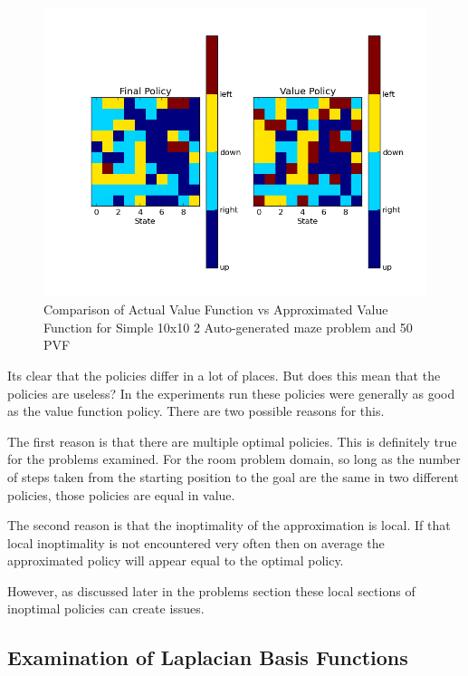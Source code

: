 \documentclass[12pt, letterpaper, final]{report}
\begin{document}
\FloatBarrier
\begin{figure}[h!]
\centering
\includegraphics[scale=.5]{images/maze01_policy_comparison_k50_s5000.png}
\caption{Comparison of Actual Value Function vs Approximated Value
  Function for Simple 10x10 2 Auto-generated maze problem and 50 PVF}
\label{valueVsQ3}
\end{figure}
\FloatBarrier

Its clear that the policies differ in a lot of places. But does this
mean that the policies are useless? In the experiments run these
policies were generally as good as the value function policy. There
are two possible reasons for this.

The first reason is that there are multiple optimal policies. This
is definitely true for the problems examined. For the room problem
domain, so long as the number of
steps taken from the starting position to the goal are the same in two
different policies, those policies are equal in value.

The second reason is that the inoptimality of the approximation is
local. If that local inoptimality is not encountered very often then
on average the approximated policy will appear equal to the optimal
policy.

However, as discussed later in the problems section these local
sections of inoptimal policies can create issues.

\subsection*{Examination of Laplacian Basis Functions}
\end{document}
